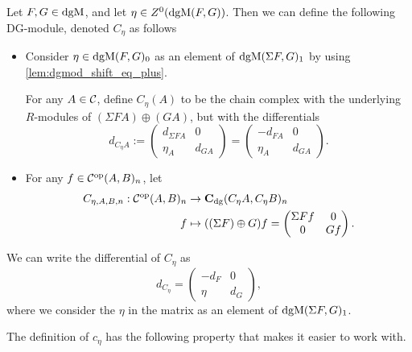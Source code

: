 \begin{definition}
    \label{def:dgm_cone}
    Let \( F, G \in \operatorname{dgM} \), and let \( \eta \in Z^0(\operatorname{dgM}(F, G)) \). Then we can define the following DG-module, denoted \( C_{\eta} \) as follows
    \begin{itemize}
        \item {
            Consider \( \eta \in \operatorname{dgM}(F, G)_0 \) as an element of \( \operatorname{dgM}(\Sigma F, G)_1 \) by using \autoref{lem:dgmod_shift_eq_plus}.

            For any \( A \in {\mathcal{C}} \), define \( C_{\eta}(A) \) to be the chain complex with the underlying \( R \)-modules of \( (\Sigma F A) \oplus (G A) \), but with the differentials
            \[
                d_{C_{\eta}A} :=
                \begin{pmatrix}
                    d_{\Sigma F A} & 0 \\
                    \eta_A & d_{GA}
                \end{pmatrix}
                =
                \begin{pmatrix}
                    -d_{F A} & 0 \\
                    \eta_A & d_{GA}
                \end{pmatrix}.
            \]
        }
        \item {
            For any \( f \in {\mathcal{C}}^{\operatorname{op}}(A, B)_n \), let
            \begin{align*}
                C_{\eta, A, B, n}: {\mathcal{C}}^{\operatorname{op}}(A, B)_n &\to \operatorname{\mathbf{C}}_{\operatorname{dg}}(C_{\eta} A, C_{\eta} B)_n \\
                f &\mapsto ((\Sigma F) \oplus G) f = 
                \begin{pmatrix}
                    \Sigma F f & 0 \\
                    0 & G f
                \end{pmatrix}.
            \end{align*}
        }
    \end{itemize}
\end{definition}

We can write the differential of \( C_{\eta} \) as
\[
    d_{C_{\eta}} =
    \begin{pmatrix}
        -d_F & 0 \\
        \eta & d_G
    \end{pmatrix},
\]
where we consider the \( \eta \) in the matrix as an element of \( \operatorname{dgM}(\Sigma F, G)_1 \).

The definition of \( c_{\eta} \) has the following property that makes it easier to work with.

